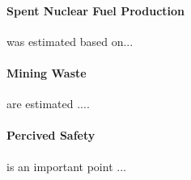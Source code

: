 \paragraph{Spent Nuclear Fuel Production} was estimated based on...

\paragraph{Mining Waste} are estimated ....

\paragraph{Percived Safety} is an important point ...
